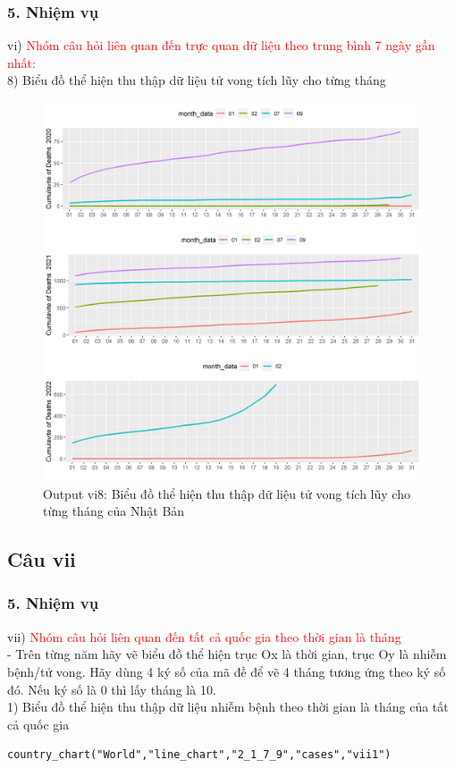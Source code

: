 \documentclass[english,10pt,table]{beamer}
\begin{document}
\begin{frame}[fragile]
\frametitle{5.  Nhiệm vụ}
vi) \textcolor{red}{Nhóm câu hỏi liên quan đến trực quan dữ liệu theo trung bình 7 ngày gần nhất:}\\
    8) Biểu đồ thể hiện thu thập dữ liệu tử vong tích lũy cho từng tháng
	\begin{figure}[h!]
	\begin{center}
		    \includegraphics[scale = 0.26]{Images/VI/vi8 Japan .jpeg}
		     \caption{Output vi8: Biểu đồ thể hiện thu thập dữ liệu tử vong tích lũy cho từng tháng của Nhật Bản}
		\end{center}
		\end{figure}
\end{frame}

\subsection{Câu vii}
\begin{frame}[fragile]
\frametitle{5.  Nhiệm vụ}
vii) \textcolor{red}{Nhóm câu hỏi liên quan đến tất cả quốc gia theo thời gian là tháng }\\
- Trên từng năm hãy vẽ biểu đồ thể hiện trục Ox là thời gian, trục Oy là nhiễm bệnh/tử vong. Hãy dùng 4 ký số của mã đề để vẽ 4 tháng tương ứng theo ký số đó. Nếu ký số là 0 thì lấy tháng là 10.\\

    1) Biểu đồ thể hiện thu thập dữ liệu nhiễm bệnh theo thời gian là tháng của tất cả quốc gia
\begin{lstlisting}[frame = single,basicstyle=\tiny]
country_chart("World","line_chart","2_1_7_9","cases","vii1")
		\end{lstlisting}
\end{frame}
\end{document}
